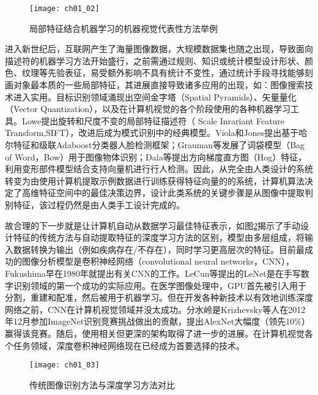 \begin{figure}[!htbp]
    \centering
    \texttt{[image: ch01\_02]}
    \caption{局部特征结合机器学习的机器视觉代表性方法举例}
    \label{fig:ch01_02}
\end{figure}

进入新世纪后，互联网产生了海量图像数据，大规模数据集也随之出现，导致面向描述符的机器学习方法开始盛行，之前需通过规则、知识或统计模型设计形状、颜色、纹理等先验表征，易受额外影响不具有统计不变性，通过统计手段寻找能够刻画对象最本质的一些局部特征，其进展直接导致诸多应用的出现，如：图像搜索技术进入实用。目标识别领域涌现出空间金字塔（Spatial Pyramids）\citep{Lazebnik2006}、矢量量化（Vector Quantization）\citep{Yang2009b}，以及在计算机视觉的各个阶段使用的各种机器学习工具。Lowe\citep{Lowe2004}提出旋转和尺度不变的局部特征描述符（ Scale Inrariant Feature Transform,SIFT），改进后成为模式识别中的经典模型。Viola和Jones\citep{Viola2001}提出基于哈尔特征和级联Adaboost分类器人脸检测框架；Grauman等\citep{Grauman2005}发展了词袋模型（Bag of Word，Bow）用于图像物体识别；Dala等\citep{Dalal2005}提出方向梯度直方图（Hog）特征，利用变形部件模型结合支持向量机进行行人检测。因此，从完全由人类设计的系统转变为由使用计算机提取示例数据进行训练获得特征向量的的系统，计算机算法决定了高维特征空间中的最佳决策边界，设计此类系统的关键步骤是从图像中提取判别特征，该过程仍然是由人类手工设计完成的。

故合理的下一步就是让计算机自动从数据学习最佳特征表示，如图\ref{fig:ch01_03}揭示了手动设计特征的传统方法与自动提取特征的深度学习方法的区别，模型由多层组成，将输入数据转换为输出（例如疾病存在/不存在），同时学习更高层次的特征。目前最成功的图像分析模型是卷积神经网络（convolutional neural networks，CNN），Fukushima早在1980年就提出有关CNN的工作\citep{Fukushima1982Neocognitron}。LeCun等\citep{Lecun1990Handwritten}提出的LeNet是在手写数字识别领域的第一个成功的实际应用。在医学图像处理中，GPU首先被引入用于分割，重建和配准，然后被用于机器学习。但在开发各种新技术以有效地训练深度网络之前，CNN在计算机视觉领域并没太成功。分水岭是Krizhevsky等人\citep{Krizhevsky2012}在2012年12月参加ImageNet\citep{Deng2009ImageNet}识别竞赛挑战做出的贡献，提出AlexNet大幅度（领先10\%）赢得该竞赛。随后，使用相关但更深的架构取得了进一步的进展\citep{Simonyan2014a,Szegedy2015,he15}。在计算机视觉各个任务领域，深度卷积神经网络现在已经成为首要选择的技术。
\begin{figure}[!htbp]
    \centering
    \texttt{[image: ch01\_03]}
    \caption{传统图像识别方法与深度学习方法对比}
    \label{fig:ch01_03}
\end{figure}

